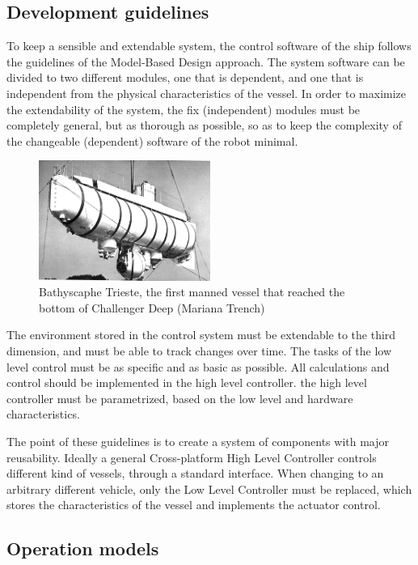 \subsection*{Development guidelines}
To keep a sensible and extendable system, the control software of the ship follows the guidelines of the Model-Based Design approach. The system software can be divided to two different modules, one that is dependent, and one that is independent from the physical characteristics of the vessel. In order to maximize the extendability of the system, the fix (independent) modules must be completely general, but as thorough as possible, so as to keep the complexity of the changeable (dependent) software of the robot minimal.
\begin{figure}
  \begin{center}
    \includegraphics[width=0.5\textwidth]{img/trieste}
  \end{center}
  \caption{Bathyscaphe Trieste, the first manned vessel that reached the bottom of Challenger Deep (Mariana Trench)\cite{trieste}}
\end{figure}

The environment stored in the control system must be extendable to the third dimension, and must be able to track changes over time.
The tasks of the low level control must be as specific and as basic as possible. All calculations and control should be implemented in the high level controller.
the high level controller must be parametrized, based on the low level and hardware characteristics.

The point of these guidelines is to create a system of components with major reusability. Ideally a general Cross-platform High Level Controller controls different kind of vessels, through a standard interface. When changing to an arbitrary different vehicle, only the Low Level Controller must be replaced, which stores the characteristics of the vessel and implements the actuator control.

\subsection*{Operation models}

